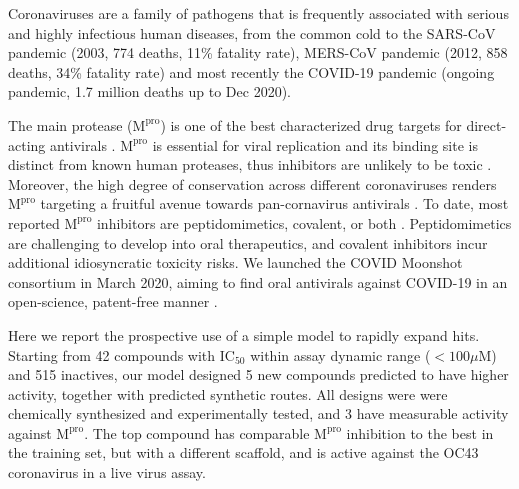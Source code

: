 \documentclass[twoside,twocolumn,9pt]{article}
\begin{document}


\rmfamily %



Coronaviruses are a family of pathogens that is frequently associated with serious and highly infectious human diseases, from the common cold to the SARS-CoV pandemic (2003, 774 deaths, 11\% fatality rate), MERS-CoV pandemic (2012, 858 deaths, 34\% fatality rate) and most recently the COVID-19 pandemic (ongoing pandemic, 1.7 million deaths up to Dec 2020). %

The main protease ($\mathrm{M}^\mathrm{pro}$) is one of the best characterized drug targets for direct-acting antivirals \cite{pillaiyar2016overview,cannalire2020targeting}. $\mathrm{M}^\mathrm{pro}$ is essential for viral replication and its binding site is distinct from known human proteases, thus inhibitors are unlikely to be toxic \cite{jin2020structure,liu2020development}. Moreover, the high degree of conservation across different coronaviruses renders $\mathrm{M}^\mathrm{pro}$ targeting a fruitful avenue towards pan-cornavirus antivirals \cite{ullrich2020sars}. To date, most reported $\mathrm{M}^\mathrm{pro}$ inhibitors are peptidomimetics, covalent, or both \cite{cannalire2020targeting}. Peptidomimetics are challenging to develop into oral therapeutics, and covalent inhibitors incur additional idiosyncratic toxicity risks. We launched the COVID Moonshot consortium in March 2020, aiming to find oral antivirals against COVID-19 in an open-science, patent-free manner \cite{chodera2020crowdsourcing}. 

Here we report the prospective use of a simple model to rapidly expand hits. Starting from 42 compounds with $\mathrm{IC}_{50}$ within assay dynamic range ($<100 \mu$M) and 515 inactives, our model designed 5 new compounds predicted to have higher activity, together with predicted synthetic routes. All designs were were chemically synthesized and experimentally tested, and 3 have measurable activity against $\mathrm{M}^\mathrm{pro}$. The top compound has comparable $\mathrm{M}^\mathrm{pro}$ inhibition to the best in the training set, but with a different scaffold, and is active against the OC43 coronavirus in a live virus assay. 
\end{document}
